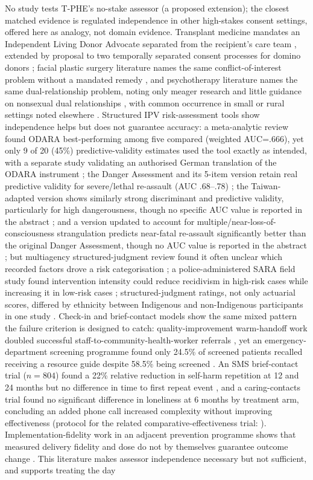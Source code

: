 \documentclass[11pt]{article}
\newcommand{\tphe}{T\mbox{-}PHE}
\begin{document}
No study tests \tphe{}'s no-stake assessor (a proposed extension); the closest matched evidence is regulated independence in other high-stakes consent settings, offered here as analogy, not domain evidence. Transplant medicine mandates an Independent Living Donor Advocate separated from the recipient's care team \cite{ref158,ref159}, extended by proposal to two temporally separated consent processes for domino donors \cite{ref160}; facial plastic surgery literature names the same conflict-of-interest problem without a mandated remedy \cite{ref161}, and psychotherapy literature names the same dual-relationship problem, noting only meager research and little guidance on nonsexual dual relationships \cite{ref162}, with common occurrence in small or rural settings noted elsewhere \cite{ref163}. Structured IPV risk-assessment tools show independence helps but does not guarantee accuracy: a meta-analytic review found ODARA best-performing among five compared (weighted AUC=.666), yet only 9 of 20 (45\%) predictive-validity estimates used the tool exactly as intended, with a separate study validating an authorised German translation of the ODARA instrument \cite{ref164,ref168}; the Danger Assessment and its 5-item version retain real predictive validity for severe/lethal re-assault (AUC .68--.78) \cite{ref166}; the Taiwan-adapted version shows similarly strong discriminant and predictive validity, particularly for high dangerousness, though no specific AUC value is reported in the abstract \cite{ref165}; and a version updated to account for multiple/near-loss-of-consciousness strangulation predicts near-fatal re-assault significantly better than the original Danger Assessment, though no AUC value is reported in the abstract \cite{ref167}; but multiagency structured-judgment review found it often unclear which recorded factors drove a risk categorisation \cite{ref169}; a police-administered SARA field study found intervention intensity could reduce recidivism in high-risk cases while increasing it in low-risk cases \cite{ref170}; structured-judgment ratings, not only actuarial scores, differed by ethnicity between Indigenous and non-Indigenous participants in one study \cite{ref171}. Check-in and brief-contact models show the same mixed pattern the failure criterion is designed to catch: quality-improvement warm-handoff work doubled successful staff-to-community-health-worker referrals \cite{ref172}, yet an emergency-department screening programme found only 24.5\% of screened patients recalled receiving a resource guide despite 58.5\% being screened \cite{ref173}. An SMS brief-contact trial ($n=804$) found a 22\% relative reduction in self-harm repetition at 12 and 24 months but no difference in time to first repeat event \cite{ref174}, and a caring-contacts trial found no significant difference in loneliness at 6 months by treatment arm, concluding an added phone call increased complexity without improving effectiveness \cite{ref176} (protocol for the related comparative-effectiveness trial: \cite{ref175}). Implementation-fidelity work in an adjacent prevention programme shows that measured delivery fidelity and dose do not by themselves guarantee outcome change \cite{ref179}. This literature makes assessor independence necessary but not sufficient, and supports treating the day 
\end{document}
